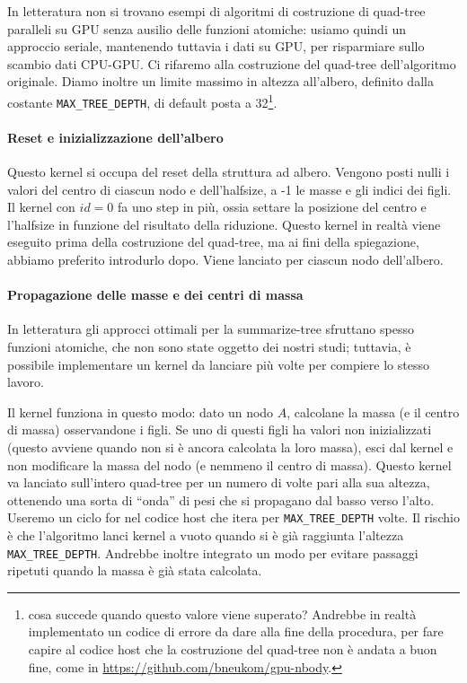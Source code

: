 \documentclass{article}
\begin{document}
	In letteratura non si trovano esempi di algoritmi di costruzione di quad-tree paralleli su GPU senza ausilio delle funzioni atomiche: usiamo quindi un approccio seriale, mantenendo tuttavia i dati su GPU, per risparmiare sullo scambio dati CPU-GPU. 
	Ci rifaremo alla costruzione del quad-tree dell'algoritmo originale. Diamo inoltre un limite massimo in altezza all'albero, definito dalla costante \verb|MAX_TREE_DEPTH|, di default posta a 32\footnote{cosa succede quando questo valore viene superato? Andrebbe in realtà implementato un codice di errore da dare alla fine della procedura, per fare capire al codice host che la costruzione del quad-tree non è andata a buon fine, come in \url{https://github.com/bneukom/gpu-nbody}.}.
\paragraph{Reset e inizializzazione dell'albero} Questo kernel si occupa del reset della struttura ad albero. Vengono posti nulli i valori del centro di ciascun nodo e dell'halfsize, a -1 le masse e gli indici dei figli. Il kernel con $id=0$ fa uno step in più, ossia settare la posizione del centro e l'halfsize in funzione del risultato della riduzione. Questo kernel in realtà viene eseguito prima della costruzione del quad-tree, ma ai fini della spiegazione, abbiamo preferito introdurlo dopo. Viene lanciato per ciascun nodo dell'albero.

\paragraph{Propagazione delle masse e dei centri di massa}
In letteratura gli approcci ottimali per la summarize-tree sfruttano spesso funzioni atomiche, che non sono state oggetto dei nostri studi; tuttavia, è possibile implementare un kernel da lanciare più volte per compiere lo stesso lavoro.

Il kernel funziona in questo modo: dato un nodo $A$, calcolane la massa (e il centro di massa) osservandone i figli. Se uno di questi figli ha valori non inizializzati (questo avviene quando non si è ancora calcolata la loro massa), esci dal kernel e non modificare la massa del nodo (e nemmeno il centro di massa). 
Questo kernel va lanciato sull'intero quad-tree per un numero di volte pari alla sua altezza, ottenendo una sorta di ``onda'' di pesi che si propagano dal basso verso l'alto. Useremo un ciclo for nel codice host che itera per \verb|MAX_TREE_DEPTH| volte. Il rischio è che l'algoritmo lanci kernel a vuoto quando si è già raggiunta l'altezza \verb|MAX_TREE_DEPTH|. Andrebbe inoltre integrato un modo per evitare passaggi ripetuti quando la massa è già stata calcolata.
\end{document}
